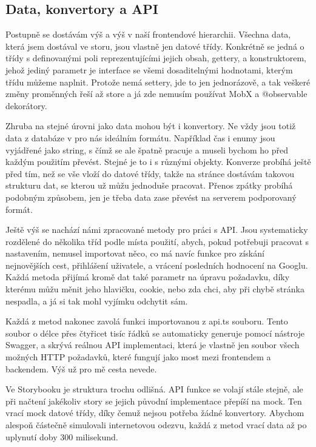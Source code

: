 \subsection{Data, konvertory a API}
Postupně se dostávám výš a výš v naší frontendové hierarchii. Všechna data, která jsem dostával ve storu, jsou vlastně jen datové třídy. Konkrétně se jedná o třídy s definovanými poli reprezentujícími jejich obsah, gettery, a konstruktorem, jehož jediný parametr je interface se všemi dosaditelnými hodnotami, kterým třídu můžeme naplnit. Protože nemá settery, jde to jen jednorázově, a tak veškeré změny proměnných řeší až store a já zde nemusím používat MobX a @observable dekorátory.

Zhruba na stejné úrovni jako data mohou být i konvertory. Ne vždy jsou totiž data z databáze v pro nás ideálním formátu. Například čas i enumy jsou vyjádřené jako string, s čímž se ale špatně pracuje a museli bychom ho před každým použitím převést. Stejné je to i s různými objekty. Konverze probíhá ještě před tím, než se vše vloží do datové třídy, takže na stránce dostávám takovou strukturu dat, se kterou už můžu jednoduše pracovat. Přenos zpátky probíhá podobným způsobem, jen je třeba data zase převést na serverem podporovaný formát.

Ještě výš se nachází námi zpracované metody pro práci s API. Jsou systematicky rozdělené do několika tříd podle místa použití, abych, pokud potřebuji pracovat s nastavením, nemusel importovat něco, co má navíc funkce pro získání nejnovějších cest, přihlášení uživatele, a vrácení posledních hodnocení na Googlu. Každá metoda přijímá kromě dat také parametr na úpravu požadavku, díky kterému můžu měnit jeho hlavičku, cookie, nebo zda chci, aby při chybě stránka nespadla, a já si tak mohl vyjímku odchytit sám.

Každá z metod nakonec zavolá funkci importovanou z api.ts souboru. Tento soubor o délce přes čtyřicet tisíc řádků se automaticky generuje pomocí nástroje Swagger, a skrývá reálnou API implementaci, která je vlastně jen soubor všech možných HTTP požadavků, které fungují jako most mezi frontendem a backendem. Výš už pro mě cesta nevede.

Ve Storybooku je struktura trochu odlišná. API funkce se volají stále stejně, ale při načtení jakékoliv story se jejich původní implementace přepíší na mock. Ten vrací mock datové třídy, díky čemuž nejsou potřeba žádné konvertory. Abychom alespoň částečně simulovali internetovou odezvu, každá z metod vrací data až po uplynutí doby 300 milisekund.